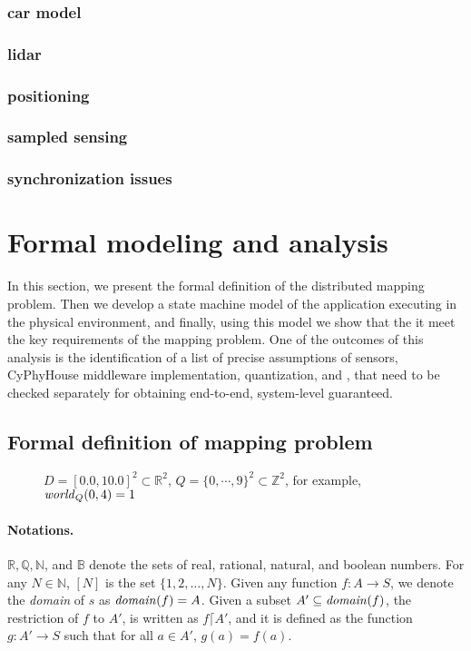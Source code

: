\subsubsection{car model}
\subsubsection{lidar}
\subsubsection{positioning}
\subsubsection{sampled sensing}
\subsubsection{synchronization issues}

\section{Formal modeling and analysis}
\label{sec:formal}

In this section, we present the formal definition of the distributed mapping problem. Then we develop a state machine model of the \dmap application executing in the physical environment, and finally, using this model we show that the it meet the key requirements of the mapping problem. One of the outcomes of this analysis is the identification of a list of precise 
 assumptions of sensors, CyPhyHouse middleware implementation, quantization, and , that need to be checked separately for obtaining end-to-end, system-level guaranteed. 
 
\subsection{Formal definition of mapping problem}
\label{sec:prelims}

\begin{figure}[t]



\caption{$D = [0.0,10.0]^2 \subset \mathbb{R}^2$, $Q=\{0, \cdots, 9\}^2 \subset \mathbb{Z}^2$, for example, $\mathit{world}_Q(0,4) = 1$}
\end{figure}

\paragraph{Notations.}
$\mathbb{R}, \mathbb{Q},\mathbb{N}$, and $\mathbb{B}$ denote the sets of real, rational, natural, and boolean numbers.
For any $N \in \mathbb{N}$, $[N]$ is the set $\{1,2,\ldots,N\}$.
%
Given any function $f:A \rightarrow S$, we denote the {\em domain\/} of $s$ as $\mathit{domain}(f) = A$.
%
Given a subset $A' \subseteq \mathit{domain}(f)$, 
    the restriction of $f$ to $A'$, is written as $f \lceil A'$, and it is defined as the function $g:A' \rightarrow S$ such that for all $a \in A'$, $g(a) = f(a)$.

